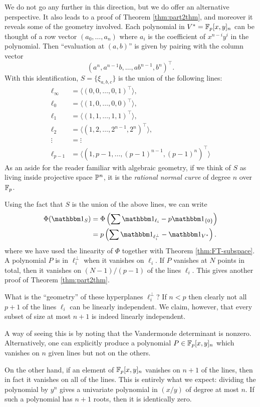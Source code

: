 We do not go any further in this direction, but we do offer an alternative perspective. It also leads to a proof of Theorem \ref{thm:part2thm}, and moreover it reveals some of the geometry involved. Each polynomial in $V^* = \F_p[x,y]_n$ can be thought of a row vector $(a_0,\ldots,a_n)$ where $a_i$ is the coefficient of $x^{n-i}y^i$ in the polynomial. Then ``evaluation at $(a,b)$'' is given by pairing with the column vector
\[
	(a^n,a^{n-1}b,\ldots,ab^{n-1},b^n)^\top.
\]
With this identification, $S = \{\xi_{a,b,c}\}$ is the union of the following lines:
\begin{align*}
	\ell_\infty &= \langle (0,0,\ldots,0,1)^\top \rangle,\\
	\ell_0 &= \langle (1,0,\ldots,0,0)^\top \rangle,\\
	\ell_1 &= \langle (1,1,\ldots,1,1)^\top \rangle,\\
	\ell_2 &= \langle (1,2,\ldots,2^{n-1},2^n)^\top \rangle,\\
	\vdots &= \vdots\\
	\ell_{p-1} &= \langle (1,p-1,\ldots,(p-1)^{n-1},(p-1)^n)^\top \rangle
\end{align*}
As an aside for the reader familiar with algebraic geometry, if we think of $S$ as living inside projective space $\P^{n}$, it is the \emph{rational normal curve} of degree $n$ over $\F_p$.

Using the fact that $S$ is the union of the above lines, we can write
\begin{align*}
	\Phi(\IND_S) &= \Phi\left( \sum \IND_{\ell_i} - p\IND_{\{0\}} \right)\\
	&= p\left(\sum \IND_{\ell_i^\bot} - \IND_{V^*}\right).
\end{align*}
where we have used the linearity of $\Phi$ together with Theorem \ref{thm:FT-subspace}. A polynomial $P$ is in $\ell_i^\bot$ when it vanishes on $\ell_i$. If $P$ vanishes at $N$ points in total, then it vanishes on $(N - 1)/(p-1)$ of the lines $\ell_i$. This gives another proof of Theorem \ref{thm:part2thm}.

What is the ``geometry'' of these hyperplanes $\ell_i^\bot$? If $n < p$ then clearly not all $p+1$ of the lines $\ell_i$ can be linearly independent. We claim, however, that every subset of size at most $n+1$ is indeed linearly independent.

A way of seeing this is by noting that the Vandermonde determinant is nonzero. Alternatively, one can explicitly produce a polynomial $P \in \F_p[x,y]_n$ which vanishes on $n$ given lines but not on the others.

On the other hand, if an element of $\F_p[x,y]_n$ vanishes on $n+1$ of the lines, then in fact it vanishes on all of the lines. This is entirely what we expect: dividing the polynomial by $y^n$ gives a univariate polynomial in $(x/y)$ of degree at most $n$. If such a polynomial has $n+1$ roots, then it is identically zero.